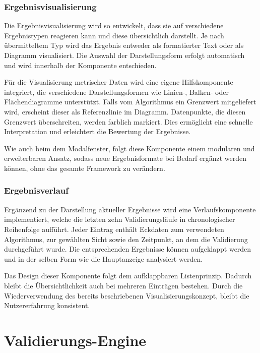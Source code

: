 \subsubsection*{Ergebnisvisualisierung}
\label{subsubsec:ergebnisvis}

Die Ergebnisvisualisierung wird so entwickelt, dass sie auf verschiedene Ergebnistypen reagieren kann und diese übersichtlich darstellt. Je nach übermitteltem Typ wird das Ergebnis entweder als formatierter Text oder als Diagramm visualisiert. Die Auswahl der Darstellungsform erfolgt automatisch und wird innerhalb der Komponente entschieden.

Für die Visualisierung metrischer Daten wird eine eigene Hilfskomponente integriert, die verschiedene Darstellungsformen wie Linien-, Balken- oder Flächendiagramme unterstützt. Falls vom Algorithmus ein Grenzwert mitgeliefert wird, erscheint dieser als Referenzlinie im Diagramm. Datenpunkte, die diesen Grenzwert überschreiten, werden farblich markiert. Dies ermöglicht eine schnelle Interpretation und erleichtert die Bewertung der Ergebnisse.

Wie auch beim dem Modalfenster, folgt diese Komponente einem modularen und erweiterbaren Ansatz, sodass neue Ergebnisformate bei Bedarf ergänzt werden können, ohne das gesamte Framework zu verändern.

\subsubsection*{Ergebnisverlauf}
\label{subsubsec:ergebnisverlauf}


Ergänzend zu der Darstellung aktueller Ergebnisse wird eine Verlaufskomponente implementiert, welche die letzten zehn Validierungsläufe in chronologischer Reihenfolge aufführt. Jeder Eintrag enthält Eckdaten zum verwendeten Algorithmus, zur gewählten Sicht sowie den Zeitpunkt, an dem die Validierung durchgeführt wurde. Die entsprechenden Ergebnisse können aufgeklappt werden und in der selben Form wie die Hauptanzeige analysiert werden.

Das Design dieser Komponente folgt dem aufklappbaren Listenprinzip. Dadurch bleibt die Übersichtlichkeit auch bei mehreren Einträgen bestehen. Durch die Wiederverwendung des bereits beschriebenen Visualisierungskonzept, bleibt die Nutzererfahrung konsistent.

\section{Validierungs-Engine}

